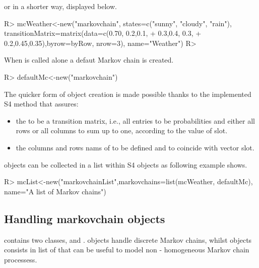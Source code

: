 \documentclass[nojss]{jss}
\begin{document}
or in a shorter way, displayed below.

\begin{Schunk}
\begin{Sinput}
R> mcWeather<-new("markovchain", states=c("sunny", "cloudy", "rain"), transitionMatrix=matrix(data=c(0.70, 0.2,0.1,
+                         0.3,0.4, 0.3,
+                         0.2,0.45,0.35),byrow=byRow, nrow=3), name="Weather")
R> 
\end{Sinput}
\end{Schunk}

When  is called alone a defaut Markov chain is created.

\begin{Schunk}
\begin{Sinput}
R> defaultMc<-new("markovchain")
\end{Sinput}
\end{Schunk}

The quicker form of object creation is made possible thanks to the implemented  S4 method that assures:

\begin{itemize}
  \item the  to be a transition matrix, i.e., all entries to be probabilities and either all rows or all columns to sum up to one, according to the value of  slot.
  \item the columns and rows nams of  to be defined and to coincide with  vector slot. 
\end{itemize}

 objects can be collected in a list within  S4 objects as following example shows.

\begin{Schunk}
\begin{Sinput}
R> mcList<-new("markovchainList",markovchains=list(mcWeather, defaultMc), name="A list of Markov chains")
\end{Sinput}
\end{Schunk}



\subsection{Handling markovchain objects}

 contains two classes,  and .  objects handle discrete Markov chains, whilst  objects consists in list of  that can be useful to model non - homogeneous Markov chain processess.\\
\end{document}
